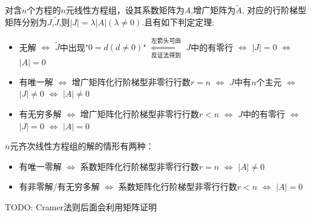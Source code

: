 \begin{theorem}
    对含$n$个方程的$n$元线性方程组，设其系数矩阵为$A$,增广矩阵为$\widetilde{A}$,
    对应的行阶梯型矩阵分别为$J$,$\widetilde{J}$,则$|J| = \lambda  |A|(\lambda \neq 0)$.且有如下判定定理:
    \begin{itemize}
        \item 无解 $\Longleftrightarrow$ $\widetilde{J}$中出现"$0=d(d \neq 0)$" $\mathop{\Longleftrightarrow}\limits^{\text{左箭头可由}}_{\text{反证法得到}}$ $J$中的有零行 $\Longleftrightarrow$ $|J| = 0$ $\Longleftrightarrow$ $|A| = 0$
        \item 有唯一解 $\Longleftrightarrow$ 增广矩阵化行阶梯型非零行行数$r=n$ $\Longleftrightarrow$ $J$中有$n$个主元 $\Longleftrightarrow$ $|J| \neq 0$ $\Longleftrightarrow$ $|A| \neq 0$
        \item 有无穷多解 $\Longleftrightarrow$ 增广矩阵化行阶梯型非零行行数$r<n$ $\Longleftrightarrow$ $J$中的有零行 $\Longleftrightarrow$ $|J| = 0$ $\Longleftrightarrow$ $|A| = 0$
    \end{itemize}
\end{theorem}
\begin{corollary}
    $n$元齐次线性方程组的解的情形有两种：
    \begin{itemize}
        \item 有唯一零解  $\Longleftrightarrow$ 系数矩阵化行阶梯型非零行行数$r=n$ $\Longleftrightarrow$ $|A| \neq 0$
        \item 有非零解/有无穷多解 $\Longleftrightarrow$ 系数矩阵化行阶梯型非零行行数$r<n$ $\Longleftrightarrow$ $|A| = 0$
    \end{itemize}
\end{corollary}

TODO: Cramer法则后面会利用矩阵证明
